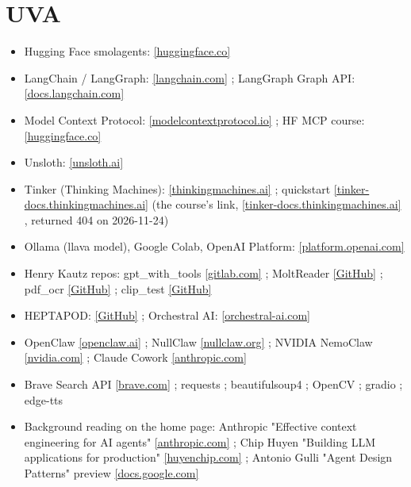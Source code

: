 \documentclass[10pt,oneside]{report}
\begin{document}
\section{UVA}
{\small\begin{itemize}
\item Hugging Face smolagents: \href{https://huggingface.co/docs/smolagents/index}{[huggingface.co]}
\item LangChain / LangGraph: \href{https://www.langchain.com}{[langchain.com]} ; LangGraph Graph API: \href{https://docs.langchain.com/oss/python/langgraph/graph-api}{[docs.langchain.com]}
\item Model Context Protocol: \href{https://modelcontextprotocol.io/}{[modelcontextprotocol.io]} ; HF MCP course: \href{https://huggingface.co/learn/mcp-course/en/unit0/introduction}{[huggingface.co]}
\item Unsloth: \href{https://unsloth.ai/}{[unsloth.ai]}
\item Tinker (Thinking Machines): \href{https://thinkingmachines.ai/tinker/}{[thinkingmachines.ai]} ; quickstart \href{https://tinker-docs.thinkingmachines.ai/tinker/quickstart/}{[tinker-docs.thinkingmachines.ai]} (the course's link, \href{https://tinker-docs.thinkingmachines.ai/install}{[tinker-docs.thinkingmachines.ai]} , returned 404 on 2026-11-24)
\item Ollama (llava model), Google Colab, OpenAI Platform: \href{https://platform.openai.com/}{[platform.openai.com]}
\item Henry Kautz repos: gpt\_\allowbreak{}with\_\allowbreak{}tools \href{https://gitlab.com/HenryKautz/gpt_with_tools}{[gitlab.com]} ; MoltReader \href{https://github.com/HenryKautz/MoltReader}{[GitHub]} ; pdf\_\allowbreak{}ocr \href{https://github.com/HenryKautz/pdf_ocr}{[GitHub]} ; clip\_\allowbreak{}test \href{https://github.com/HenryKautz/clip_test}{[GitHub]}
\item HEPTAPOD: \href{https://github.com/tonymenzo/heptapod}{[GitHub]} ; Orchestral AI: \href{https://orchestral-ai.com}{[orchestral-ai.com]}
\item OpenClaw \href{https://openclaw.ai/}{[openclaw.ai]} ; NullClaw \href{https://nullclaw.org/}{[nullclaw.org]} ; NVIDIA NemoClaw \href{https://www.nvidia.com/en-us/ai/nemoclaw/}{[nvidia.com]} ; Claude Cowork \href{https://www.anthropic.com/product/claude-cowork}{[anthropic.com]}
\item Brave Search API \href{https://brave.com/search/api/}{[brave.com]} ; requests ; beautifulsoup4 ; OpenCV ; gradio ; edge-tts
\item Background reading on the home page: Anthropic "Effective context engineering for AI agents" \href{https://www.anthropic.com/engineering/effective-context-engineering-for-ai-agents}{[anthropic.com]} ; Chip Huyen "Building LLM applications for production" \href{https://huyenchip.com/2023/04/11/llm-engineering.html}{[huyenchip.com]} ; Antonio Gulli "Agent Design Patterns" preview \href{https://docs.google.com/document/d/1rsaK53T3Lg5KoGwvf8ukOUvbELRtH-V0LnOIFDxBryE/preview}{[docs.google.com]}

\end{itemize}}
\end{document}
